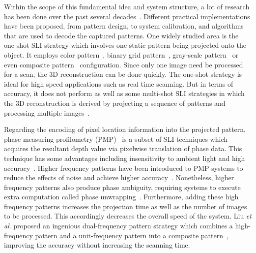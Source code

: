 \documentclass[]{spie}  %
\begin{document}
Within the scope of this fundamental idea and system structure, a lot of research has been done over the past several decades~\cite{geng11}. Different practical implementations have been proposed, from pattern design, to system calibration, and algorithms that are used to decode the captured patterns. One widely studied area is the one-shot SLI strategy which involves one static pattern being projected onto the object. It employs color pattern~\cite{wust91}, binary grid pattern~\cite{grin92}, gray-scale pattern~\cite{durd98} or even composite pattern~\cite{guan08} configuration. Since only one image need be processed for a scan, the 3D reconstruction can be done quickly. The one-shot strategy is ideal for high speed applications such as real time scanning. But in terms of accuracy, it does not perform as well as some multi-shot SLI strategies in which the 3D reconstruction is derived by projecting a sequence of patterns and processing multiple images~\cite{blai03}.

Regarding the encoding of pixel location information into the projected pattern, phase measuring profilometry (PMP)~\cite{srin85} is a subset of SLI techniques which acquires the resultant depth value via pixelwise translation of phase data. This technique has some advantages including insensitivity to ambient light and high accuracy~\cite{guan03, hali89}. Higher frequency patterns have been introduced to PMP systems to reduce the effects of noise and achieve higher accuracy~\cite{lijl03}. Nonetheless, higher frequency patterns also produce  phase ambiguity, requiring systems to execute extra computation called phase unwrapping~\cite{song18}. Furthermore, adding these high frequency patterns increases the projection time as well as the number of images to be processed. This accordingly decreases the overall speed of the system. Liu \textit{et al}. proposed an ingenious dual-frequency pattern strategy which combines a high-frequency pattern and a unit-frequency pattern into a composite pattern~\cite{liuk10}, improving the accuracy without increasing the scanning time.
\end{document}
